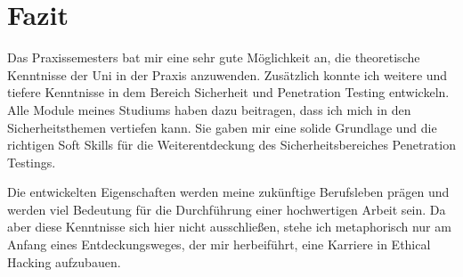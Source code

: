 \section{Fazit}

Das Praxissemesters bat mir eine sehr gute Möglichkeit an, die theoretische Kenntnisse der Uni in der Praxis anzuwenden. Zusätzlich konnte ich weitere und tiefere Kenntnisse in dem Bereich Sicherheit und Penetration Testing entwickeln. Alle Module meines Studiums haben dazu beitragen, dass ich mich in den Sicherheitsthemen vertiefen kann. Sie gaben mir eine solide Grundlage und die richtigen Soft Skills für die Weiterentdeckung des Sicherheitsbereiches Penetration Testings. 

Die entwickelten Eigenschaften werden meine zukünftige Berufsleben prägen und werden viel Bedeutung für die Durchführung einer hochwertigen Arbeit sein. Da aber diese Kenntnisse sich hier nicht ausschließen, stehe ich metaphorisch nur am Anfang eines Entdeckungsweges, der mir herbeiführt, eine Karriere in Ethical Hacking aufzubauen. 